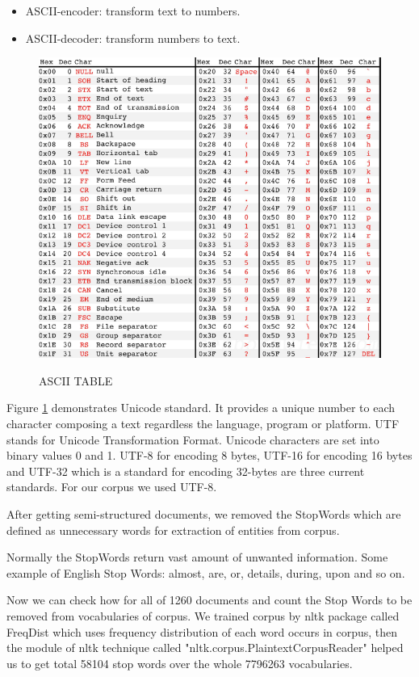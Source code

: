 \begin{itemize}
\begin{itemize}
\item  ASCII-encoder: transform text to numbers.
\item  ASCII-decoder: transform numbers to text.
\end{itemize}
\newpage
\begin{figure}[hbtp]
\caption{ASCII TABLE}
\centering
\includegraphics[scale=.5]{images/ASCII.png}\label{ASCII}
\end{figure}
\end{itemize}

Figure \ref{ASCII} demonstrates Unicode  standard. It provides  a unique number to each character composing a text regardless the language, program  or platform.
UTF stands for Unicode Transformation Format. Unicode characters are set into binary values 0 and 1. UTF-8 for encoding  8 bytes, UTF-16 for encoding 16 bytes and UTF-32 which is a standard for encoding 32-bytes are three current standards.
For our corpus we used UTF-8.

After getting semi-structured documents, we removed the StopWords which are defined as unnecessary words for extraction of entities from corpus.

Normally the StopWords return vast amount of unwanted information. Some example of English Stop Words: almost, are, or,  details, during, upon and so on.

Now we can check how for all of 1260 documents and count the Stop Words to be removed from vocabularies of corpus. We trained corpus by nltk package called FreqDist which uses  frequency distribution of each word occurs in corpus, then the module of nltk technique called "nltk.corpus.PlaintextCorpusReader" helped us to get total 58104 stop words over the whole  7796263  vocabularies.

